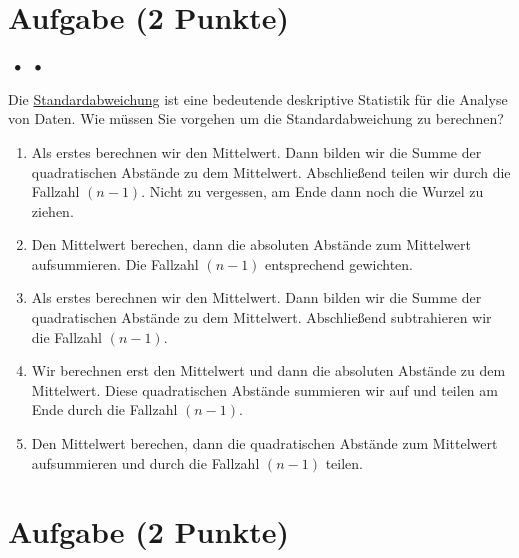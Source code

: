 \documentclass[a4paper, 9pt]{scrartcl}\usepackage[]{graphicx}\usepackage[]{xcolor}
\begin{document}
{\section{Aufgabe \hfill (2 Punkte)}

\ifcollection
\begin{flushright}
\tiny\vspace{-2Ex}
\textbf{\examinhaltstart}
\exammodulemathstat $\;\bullet$
\exammodulestat $\;\bullet$
\exammodulestatbbv 
\vspace{-1Ex}
\end{flushright}
\fi




Die \uline{Standardabweichung} ist eine bedeutende deskriptive Statistik für die Analyse von Daten. Wie müssen Sie vorgehen um die Standardabweichung zu berechnen?



\begin{enumerate}
\item [\textbf{A} \msquare] Als erstes berechnen wir den Mittelwert. Dann bilden wir die Summe der quadratischen Abstände zu dem Mittelwert. Abschließend teilen wir durch die Fallzahl $(n-1)$. Nicht zu vergessen, am Ende dann noch die Wurzel zu ziehen.
\item [\textbf{B} \msquare] Den Mittelwert berechen, dann die absoluten Abstände zum Mittelwert aufsummieren. Die Fallzahl $(n-1)$ entsprechend gewichten.
\item [\textbf{C} \msquare] Als erstes berechnen wir den Mittelwert. Dann bilden wir die Summe der quadratischen Abstände zu dem Mittelwert. Abschließend subtrahieren wir die Fallzahl $(n-1)$.
\item [\textbf{D} \msquare] Wir berechnen erst den Mittelwert und dann die absoluten Abstände zu dem Mittelwert. Diese quadratischen Abstände summieren wir auf und teilen am Ende durch die Fallzahl $(n-1)$.
\item [\textbf{E} \msquare] Den Mittelwert berechen, dann die quadratischen Abstände zum Mittelwert aufsummieren und durch die Fallzahl $(n-1)$ teilen.
\end{enumerate} 

\section{Aufgabe \hfill (2 Punkte)}

}
\end{document}
